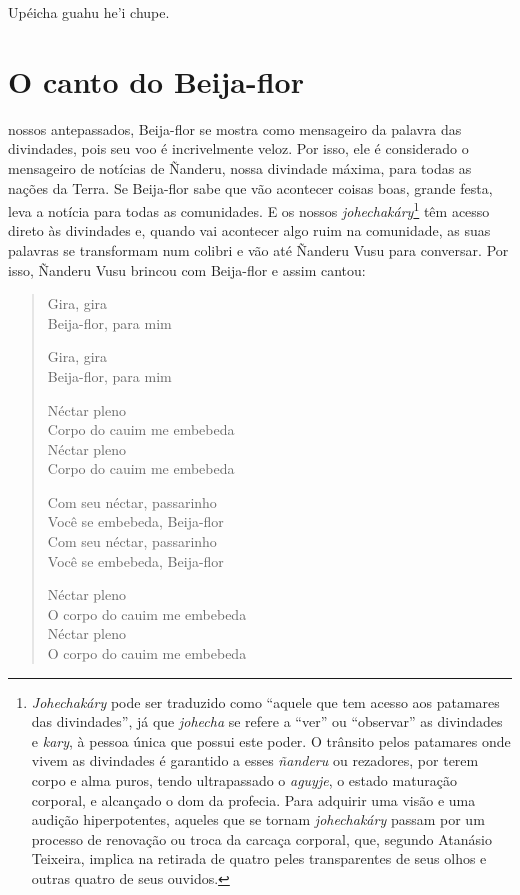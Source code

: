 Upéicha guahu he'i chupe.

\chapter{O canto do Beija-flor}

 nossos antepassados, Beija-flor se mostra como mensageiro da
palavra das divindades, pois seu voo é incrivelmente veloz. Por isso,
ele é considerado o mensageiro de notícias de Ñanderu, nossa divindade
máxima, para todas as nações da Terra. Se Beija-flor sabe que vão
acontecer coisas boas, grande festa, leva a notícia para todas as
comunidades. E os nossos \textit{johechakáry}\footnote{\textit{Johechakáry}
  pode ser traduzido como ``aquele que tem acesso aos patamares das
  divindades'', já que \textit{johecha} se refere a ``ver'' ou
  ``observar'' as divindades e \textit{kary}, à pessoa única que possui
  este poder. O trânsito pelos patamares onde vivem as divindades é
  garantido a esses \textit{ñanderu} ou rezadores, por terem corpo e alma
  puros, tendo ultrapassado o \textit{aguyje}, o estado maturação
  corporal, e alcançado o dom da profecia. Para adquirir uma visão e uma
  audição hiperpotentes, aqueles que se tornam \textit{johechakáry} passam
  por um processo de renovação ou troca da carcaça corporal, que,
  segundo Atanásio Teixeira, implica na retirada de quatro peles
  transparentes de seus olhos e outras quatro de seus ouvidos.} têm
acesso direto às divindades e, quando vai acontecer algo ruim na
comunidade, as suas palavras se transformam num colibri e vão até
Ñanderu Vusu para conversar. Por isso, Ñanderu Vusu brincou com
Beija-flor e assim cantou:

\begin{verse}
Gira, gira\\
Beija-flor, para mim

Gira, gira\\
Beija-flor, para mim

Néctar pleno\\
Corpo\footnotemark{} do cauim me embebeda\footnotemark{}\\
Néctar pleno\\
Corpo do cauim me embebeda

Com seu néctar, passarinho\\
Você se embebeda, Beija-flor\\
Com seu néctar, passarinho\\
Você se embebeda, Beija-flor

Néctar pleno\\
O corpo do cauim me embebeda\\
Néctar pleno\\
O corpo do cauim me embebeda
\end{verse}


